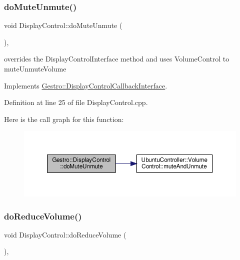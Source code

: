 \subsubsection{\texorpdfstring{do\+Mute\+Unmute()}{doMuteUnmute()}}
{\footnotesize\ttfamily void Display\+Control\+::do\+Mute\+Unmute (\begin{DoxyParamCaption}{ }\end{DoxyParamCaption})\hspace{0.3cm}{\ttfamily [override]}, {\ttfamily [virtual]}}

overrides the Display\+Control\+Interface method and uses Volume\+Control to mute\+Unmute\+Volume 

Implements \hyperlink{class_gestro_1_1_display_control_callback_interface_ab660632d549760b0404388fc8e86714a}{Gestro\+::\+Display\+Control\+Callback\+Interface}.



Definition at line 25 of file Display\+Control.\+cpp.

Here is the call graph for this function\+:
\nopagebreak
\begin{figure}[H]
\begin{center}
\leavevmode
\includegraphics[width=350pt]{class_gestro_1_1_display_control_a25f685ea6bf001e53c7d17410f2a24ea_cgraph}
\end{center}
\end{figure}
\mbox{\label{class_gestro_1_1_display_control_a874fa3f6b3e4cf465db62a4eba1c1dd1}} 
\subsubsection{\texorpdfstring{do\+Reduce\+Volume()}{doReduceVolume()}}
{\footnotesize\ttfamily void Display\+Control\+::do\+Reduce\+Volume (\begin{DoxyParamCaption}{ }\end{DoxyParamCaption})\hspace{0.3cm}{\ttfamily [override]}, {\ttfamily [virtual]}}

